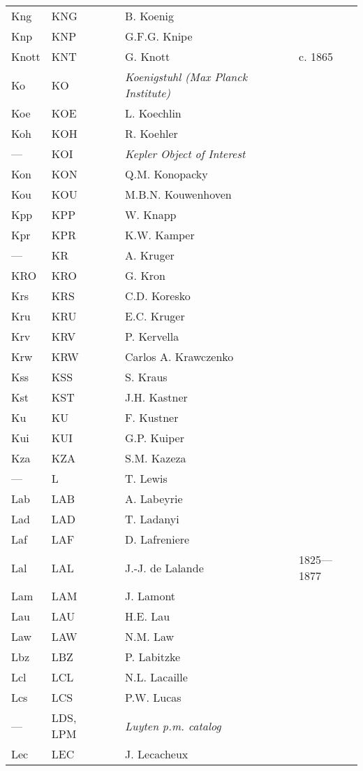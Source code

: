 \begin{longtable}{l|l|c|p{59mm}|l}
Kng & KNG &   & B. Koenig & \\
Knp & KNP &   & G.F.G. Knipe & \\
Knott & KNT &   & G. Knott & c. 1865 \\
Ko  & KO  &   & \emph{Koenigstuhl (Max Planck Institute)} & \\
Koe & KOE &   & L. Koechlin & \\
Koh & KOH &   & R. Koehler & \\
--- & KOI &   & \emph{Kepler Object of Interest} & \\
Kon & KON &   & Q.M. Konopacky & \\
Kou & KOU &   & M.B.N. Kouwenhoven & \\
Kpp & KPP &   & W. Knapp & \\
Kpr & KPR &   & K.W. Kamper & \\
--- & KR  &   & A. Kruger & \\
KRO & KRO &   & G. Kron & \\
Krs & KRS &   & C.D. Koresko & \\
Kru & KRU &   & E.C. Kruger & \\
Krv & KRV &   & P. Kervella & \\
Krw & KRW &   & Carlos A. Krawczenko & \\
Kss & KSS &   & S. Kraus & \\
Kst & KST &   & J.H. Kastner & \\
Ku  & KU  &   & F. Kustner & \\
Kui & KUI &   & G.P. Kuiper & \\
Kza & KZA &   & S.M. Kazeza & \\\midrule
--- & L   &   & T. Lewis & \\
Lab & LAB &   & A. Labeyrie & \\
Lad & LAD &   & T. Ladanyi & \\
Laf & LAF &   & D. Lafreniere & \\
Lal & LAL &   & J.-J. de Lalande & 1825---1877 \\
Lam & LAM &   & J. Lamont & \\
Lau & LAU &   & H.E. Lau & \\
Law & LAW &   & N.M. Law & \\
Lbz & LBZ &   & P. Labitzke & \\
Lcl & LCL &   & N.L. Lacaille & \\
Lcs & LCS &   & P.W. Lucas & \\
--- & LDS, LPM &   & \emph{Luyten p.m. catalog} & \\
Lec & LEC &   & J. Lecacheux & \\

\end{longtable}
